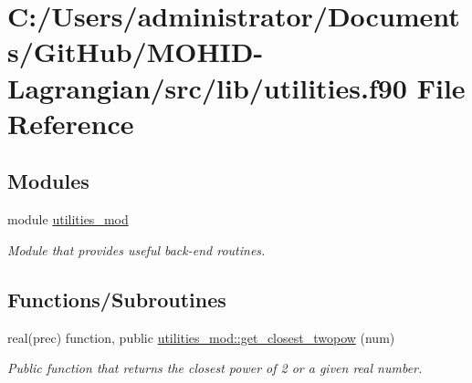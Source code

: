 \hypertarget{utilities_8f90}{}\section{C\+:/\+Users/administrator/\+Documents/\+Git\+Hub/\+M\+O\+H\+I\+D-\/\+Lagrangian/src/lib/utilities.f90 File Reference}
\label{utilities_8f90}
\subsection*{Modules}
\begin{DoxyCompactItemize}
\item 
module \hyperlink{namespaceutilities__mod}{utilities\+\_\+mod}
\begin{DoxyCompactList}\small\item\em Module that provides useful back-\/end routines. \end{DoxyCompactList}\end{DoxyCompactItemize}
\subsection*{Functions/\+Subroutines}
\begin{DoxyCompactItemize}
\item 
real(prec) function, public \hyperlink{namespaceutilities__mod_a683f93677348e11d331c1c37c66caf7a}{utilities\+\_\+mod\+::get\+\_\+closest\+\_\+twopow} (num)
\begin{DoxyCompactList}\small\item\em Public function that returns the closest power of 2 or a given real number. \end{DoxyCompactList}\end{DoxyCompactItemize}
